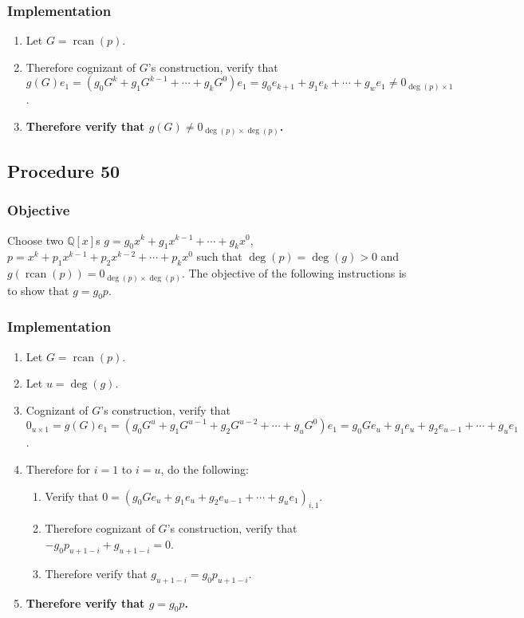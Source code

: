 \documentclass[twocolumn]{article}
\DeclareMathOperator{\rcan}{rcan}
\begin{document}
			\subsubsection{Implementation}
				\begin{enumerate}
					\item Let $G=\rcan(p)$.
					\item Therefore cognizant of $G$'s construction, verify that $g(G)e_1=(g_0G^k+g_1G^{k-1}+\cdots+g_kG^0)e_1=g_0e_{k+1}+g_1e_k+\cdots+g_we_1\ne 0_{\deg(p)\times 1}$.
					\item \textbf{Therefore verify that $g(G)\ne 0_{\deg(p)\times \deg(p)}$.}
				\end{enumerate}
		\subsection{Procedure 50}\label{sec:procedure 50}
			\subsubsection{Objective}
				Choose two $\mathbb{Q}[x]$s $g=g_0x^k+g_1x^{k-1}+\cdots+g_kx^0$, $p=x^k+p_1x^{k-1}+p_2x^{k-2}+\cdots+p_kx^0$ such that $\deg(p)=\deg(g)>0$ and $g(\rcan(p))=0_{\deg(p)\times\deg(p)}$. The objective of the following instructions is to show that $g=g_0p$.
			\subsubsection{Implementation}
				\begin{enumerate}
					\item Let $G=\rcan(p)$.
					\item Let $u=\deg(g)$.
					\item Cognizant of $G$'s construction, verify that $0_{u\times 1}=g(G)e_1=(g_0G^u+g_1G^{u-1}+g_2G^{u-2}+\cdots+g_uG^0)e_1=g_0Ge_u+g_1e_u+g_2e_{u-1}+\cdots+g_ue_1$.
					\item Therefore for $i=1$ to $i=u$, do the following:
					\begin{enumerate}
						\item Verify that $0=(g_0Ge_u+g_1e_u+g_2e_{u-1}+\cdots+g_ue_1)_{i,1}$.
						\item Therefore cognizant of $G$'s construction, verify that $-g_0p_{u+1-i}+g_{u+1-i}=0$.
						\item Therefore verify that $g_{u+1-i}=g_0p_{u+1-i}$.
					\end{enumerate}
					\item \textbf{Therefore verify that $g=g_0p$.}
				\end{enumerate}
\end{document}
